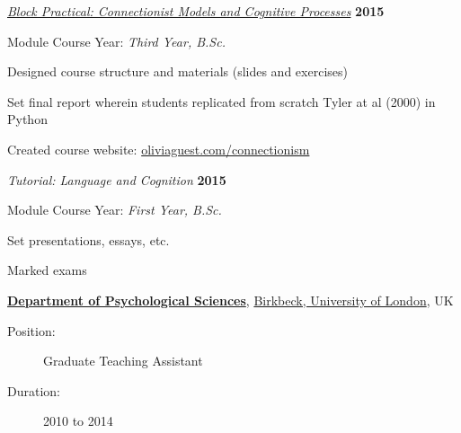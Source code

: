 \begin{outerlist}


\item[] \textit{\href{http://oliviaguest.com/connectionism}{Block Practical: Connectionist Models and Cognitive Processes}}
         \hfill \textbf{2015}
\begin{innerlist}
\item Module Course Year: \textit{Third Year, B.Sc.}
 \item Designed course structure and materials (slides and exercises)
 \item Set final report wherein students replicated from scratch Tyler at al (2000) in Python
 \item Created course website: \href{http://oliviaguest.com/connectionism}{oliviaguest.com/connectionism}
\end{innerlist}

\item[] \textit{Tutorial: Language and Cognition}
         \hfill \textbf{2015}
\begin{innerlist}
\item Module Course Year: \textit{First Year, B.Sc.}
 \item Set presentations, essays, etc.
 \item Marked exams
\end{innerlist}
\end{outerlist}

\href{http://www.bbk.ac.uk/psychology/}{\textbf{Department of Psychological Sciences}}, \href{http://www.bbk.ac.uk/}{Birkbeck, University of London},
UK
\begin{description}
 \item[Position:] Graduate Teaching Assistant
 \item[Duration:] 2010 to 2014

\end{description}


